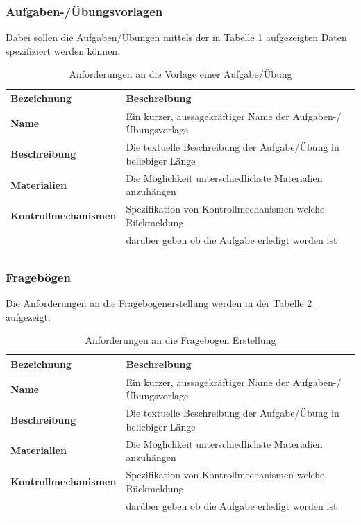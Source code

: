 \subsubsection{Aufgaben-/Übungsvorlagen}
Dabei sollen die Aufgaben/Übungen mittels der in Tabelle \ref{TabelleFunktionaleAnforderungenAufgaben} aufgezeigten Daten spezifiziert werden können.

\begin{table}[htbp]
	\begin{center}
		\begin{tabular}{p{4cm} p{10cm}}
			\rowcolor{black!20} \textbf{Bezeichnung} & \textbf{Beschreibung} \\ \toprule 
			\textbf{Name} & Ein kurzer, aussagekräftiger Name der Aufgaben-/Übungsvorlage \\ \hline \addlinespace
			\textbf{Beschreibung} & Die textuelle Beschreibung der Aufgabe/Übung in beliebiger Länge \\ \hline \addlinespace
			\textbf{Materialien} & Die Möglichkeit unterschiedlichste Materialien anzuhängen \\ \hline \addlinespace
			\textbf{Kontrollmechanismen} & Spezifikation von Kontrollmechanismen welche Rückmeldung \\ & darüber geben ob die Aufgabe erledigt worden ist \\ \hline \addlinespace
		\end{tabular}
	\end{center}
	\caption{Anforderungen an die Vorlage einer Aufgabe/Übung}
	\label{TabelleFunktionaleAnforderungenAufgaben}
\end{table}

\subsubsection{Fragebögen}
Die Anforderungen an die Fragebogenerstellung werden in der Tabelle \ref{TabelleFunktionaleAnforderungenFragebogen} aufgezeigt.

\begin{table}[htbp]
	\begin{center}
		\begin{tabular}{p{4cm} p{10cm}}
			\rowcolor{black!20} \textbf{Bezeichnung} & \textbf{Beschreibung} \\ \toprule 
			\textbf{Name} & Ein kurzer, aussagekräftiger Name der Aufgaben-/Übungsvorlage \\ \hline \addlinespace
			\textbf{Beschreibung} & Die textuelle Beschreibung der Aufgabe/Übung in beliebiger Länge \\ \hline \addlinespace
			\textbf{Materialien} & Die Möglichkeit unterschiedlichste Materialien anzuhängen \\ \hline \addlinespace
			\textbf{Kontrollmechanismen} & Spezifikation von Kontrollmechanismen welche Rückmeldung \\ & darüber geben ob die Aufgabe erledigt worden ist \\ \hline \addlinespace
		\end{tabular}
	\end{center}
	\caption{Anforderungen an die Fragebogen Erstellung}
	\label{TabelleFunktionaleAnforderungenFragebogen}
\end{table}

